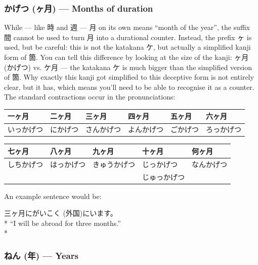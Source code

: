 \documentclass[11pt, b5paper, twoside, openright, onecolumn]{book}
\makeatletter
\newcommand*{\rubystack}[2]{{\relscale{0.5}%
  \begin{tabular}[b]{@{}c@{}}%
    {#1}\\%
   {\textscale{2}{#2}}%
  \end{tabular}}%
}
\DeclareRobustCommand*{\ruby}[2]{%
  \mbox{%
    \setlength{\parskip}{0ex}%
    \BeginAccSupp{method=pdfstringdef,ActualText={#1}}%
      \rubystack{\phantom{#2}}{#1}%
      \llap{%
        \rubystack{#2}{\phantom{#1}}%
      }%
    \EndAccSupp{}%
  }%
}
\renewcommand*{\ruby}[2]{#2 (#1)}%
\newenvironment{exampleblock}{
\setlength{\parindent}{0.6in}
\begin{minipage}[t]{\dimexpr\textwidth-\parindent}}
{\end{minipage}}
\newenvironment{mytabular}[1]{\noindent\hspace{0.4in}
\begin{tabular}[h]{#1}}{\end{tabular}}
\makeatother
\begin{document}
\subsubsection{\ruby{ヶ月}{かげつ} — Months of duration}


While — like 時 and 週 — 月 on its own means “month of the year”‚ the suffix 間 cannot be used to turn 月 into a durational counter. Instead‚ the prefix ヶ is used‚ but be careful: this is not the katakana ケ‚ but actually a simplified kanji form of 箇. You can tell this difference by looking at the size of the kanji: ヶ月 (かげつ) vs. ケ月 — the katakana ケ is much bigger than the simplified version of 箇. Why exactly this kanji got simplified to this deceptive form is not entirely clear‚ but it has‚ which means you’ll need to be able to recognise it as a counter. The standard contractions occur in the pronunciations:

\vspace{0.5cm}
\smaller
\begin{mytabular}{| l  l  l  l  l  l |}\hline 
\rule{0pt}{2.4ex}一ヶ月 & 二ヶ月 & 三ヶ月 & 四ヶ月 & 五ヶ月 & 六ヶ月\\ 
\hline
\rule{0pt}{2.4ex}いっかげつ & にかげつ & さんかげつ & よんかげつ & ごかげつ & ろっかげつ\\ 
\hline 
\end{mytabular}
\larger
\vspace{0.5cm}

\smaller
\begin{mytabular}{| l  l  l  l  l |}\hline 
\rule{0pt}{2.4ex}七ヶ月 & 八ヶ月 & 九ヶ月 & 十ヶ月 & 何ヶ月\\ 
\hline
\rule{0pt}{2.4ex}しちかげつ & はっかげつ & きゅうかげつ & じっかげつ & なんかげつ\\ 
\rule{0pt}{2.4ex} &  &  & じゅっかげつ & \\ 
\hline 
\end{mytabular}
\larger
\vspace{0.5cm}


An example sentence would be:

\vspace{0.4cm}
\begin{exampleblock}
三ヶ月に\ruby{外国}{がいこく}にいます。 \\* 
“I will be abroad for three months.” \\* 
\end{exampleblock}
\subsubsection{\ruby{年}{ねん} — Years}
\end{document}
